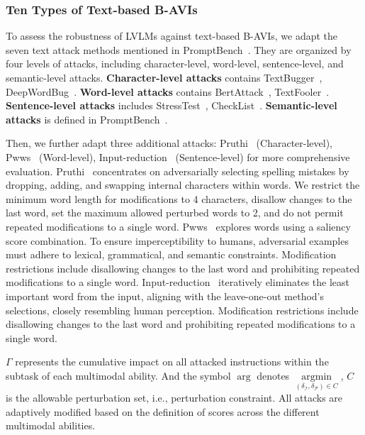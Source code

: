 \subsubsection{Ten Types of Text-based B-AVIs}
To assess the robustness of LVLMs against text-based B-AVIs, we adapt the seven text attack methods mentioned in PromptBench~\cite{zhu2023promptbench}. They are organized by four levels of attacks, including character-level, word-level, sentence-level, and semantic-level attacks. \textbf{Character-level attacks} contains TextBugger~\cite{li2018textbugger}, DeepWordBug~\cite{gao2018black}. 
\textbf{Word-level attacks} contains BertAttack~\cite{li2020bert}, TextFooler~\cite{jin2020bert}.
\textbf{Sentence-level attacks} includes StressTest~\cite{naik2018stress}, CheckList~\cite{ribeiro2020beyond}.
\textbf{Semantic-level attacks} is defined in PromptBench~\cite{zhu2023promptbench}.

Then, we further adapt three additional attacks: Pruthi~\cite{pruthi2019combating} (Character-level), Pwws~\cite{ren2019generating} (Word-level), Input-reduction~\cite{feng2018pathologies} (Sentence-level) for more comprehensive evaluation. Pruthi~\cite{pruthi2019combating} concentrates on adversarially selecting spelling mistakes by dropping, adding, and swapping internal characters within words. We restrict the minimum word length for modifications to 4 characters, disallow changes to the last word, set the maximum allowed perturbed words to 2, and do not permit repeated modifications to a single word.
Pwws~\cite{ren2019generating} explores words using a saliency score combination. To ensure imperceptibility to humans, adversarial examples must adhere to lexical, grammatical, and semantic constraints. Modification restrictions include disallowing changes to the last word and prohibiting repeated modifications to a single word.
Input-reduction~\cite{feng2018pathologies} iteratively eliminates the least important word from the input, aligning with the leave-one-out method's selections, closely resembling human perception. Modification restrictions include disallowing changes to the last word and prohibiting repeated modifications to a single word. 

$\Gamma$ represents the cumulative impact on all attacked instructions within the subtask of each multimodal ability. And the symbol $\mathop{\arg}$ denotes $\mathop{\arg\min}\limits_{(\delta_{\mathcal{I}} ,\delta_{\mathcal{P}})\in C}$, $C$ is the allowable
perturbation set, i.e., perturbation constraint.
 All attacks are adaptively modified based on the definition of scores across the different multimodal abilities. 

